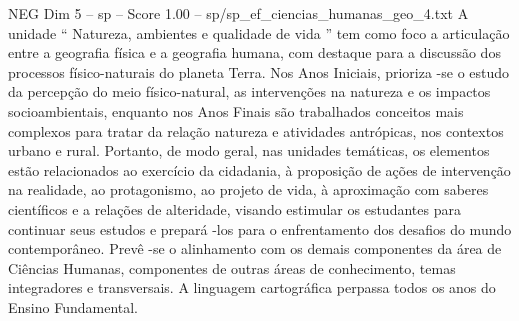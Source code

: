 \begin{textsample}{NEG Dim 5 – sp – Score 1.00 – sp/sp\_ef\_ciencias\_humanas\_geo\_4.txt}
A unidade “ Natureza, ambientes e qualidade de vida ” tem como foco a articulação entre a geografia física e a geografia humana, com destaque para a discussão dos processos físico-naturais do planeta Terra.
Nos Anos Iniciais, prioriza -se o estudo da percepção do meio físico-natural, as intervenções na natureza e os impactos socioambientais, enquanto nos Anos Finais são trabalhados conceitos mais complexos para tratar da relação natureza e atividades antrópicas, nos contextos urbano e rural.
Portanto, de modo geral, nas unidades temáticas, os elementos estão relacionados ao exercício da cidadania, à proposição de ações de intervenção na realidade, ao protagonismo, ao projeto de vida, à aproximação com saberes científicos e a relações de alteridade, visando estimular os estudantes para continuar seus estudos e prepará -los para o enfrentamento dos desafios do mundo contemporâneo.
Prevê -se o alinhamento com os demais componentes da área de Ciências Humanas, componentes de outras áreas de conhecimento, temas integradores e transversais.
A linguagem cartográfica perpassa todos os anos do Ensino Fundamental.

\end{textsample}
